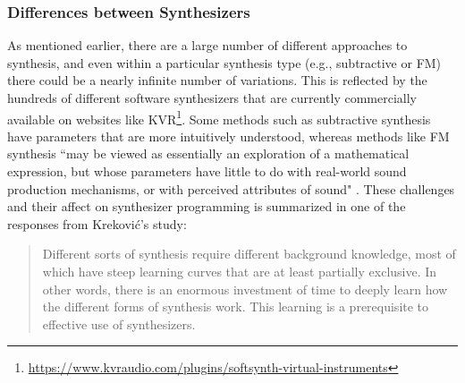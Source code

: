 \subsubsection{Differences between Synthesizers}
As mentioned earlier, there are a large number of different approaches to synthesis, and even within a particular synthesis type (e.g., subtractive or FM) there could be a nearly infinite number of variations. This is reflected by the hundreds of different software synthesizers that are currently commercially available on websites like KVR\footnote{\url{https://www.kvraudio.com/plugins/softsynth-virtual-instruments}}. Some methods such as subtractive synthesis have parameters that are more intuitively understood, whereas methods like FM synthesis ``may be viewed as essentially an exploration of a mathematical expression, but whose parameters have little to do with real-world sound production mechanisms, or with perceived attributes of sound" \cite{seago2013new}. These challenges and their affect on synthesizer programming is summarized in one of the responses from Krekovi\'{c}'s study:

\begin{quote}
    Different sorts of synthesis require different background knowledge, most of which have steep learning curves that are at least partially exclusive. In other words, there is an enormous investment of time to deeply learn how the different forms of synthesis work. This learning is a prerequisite to effective use of synthesizers.
\end{quote}





